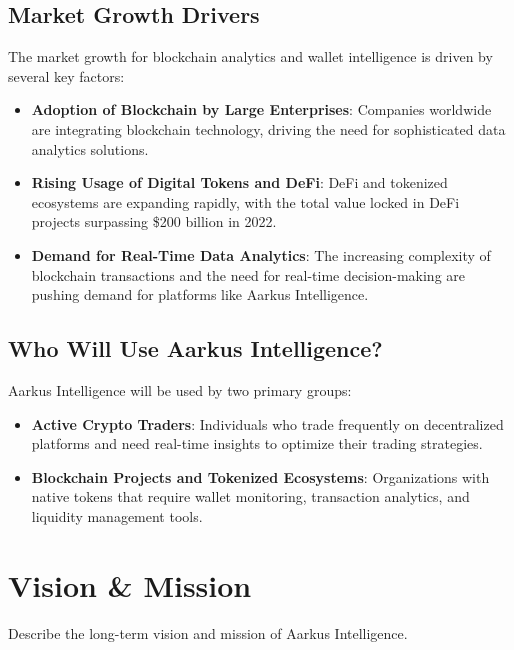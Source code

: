 \documentclass{article}
\begin{document}
\subsection{Market Growth Drivers}

The market growth for blockchain analytics and wallet intelligence is driven by several key factors:
\begin{itemize}
    \item \textbf{Adoption of Blockchain by Large Enterprises}: Companies worldwide are integrating blockchain technology, driving the need for sophisticated data analytics solutions.
    \item \textbf{Rising Usage of Digital Tokens and DeFi}: DeFi and tokenized ecosystems are expanding rapidly, with the total value locked in DeFi projects surpassing \$200 billion in 2022.
    \item \textbf{Demand for Real-Time Data Analytics}: The increasing complexity of blockchain transactions and the need for real-time decision-making are pushing demand for platforms like Aarkus Intelligence.
\end{itemize}


\subsection{Who Will Use Aarkus Intelligence?}

Aarkus Intelligence will be used by two primary groups:
\begin{itemize}
    \item \textbf{Active Crypto Traders}: Individuals who trade frequently on decentralized platforms and need real-time insights to optimize their trading strategies.
    \item \textbf{Blockchain Projects and Tokenized Ecosystems}: Organizations with native tokens that require wallet monitoring, transaction analytics, and liquidity management tools.
\end{itemize}

\section{Vision \& Mission}
Describe the long-term vision and mission of Aarkus Intelligence.
\end{document}
